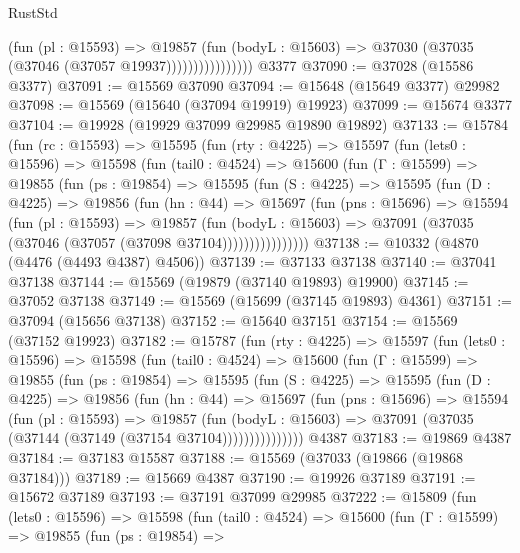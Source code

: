 \begin{lexlean}{RustStd}
\begin{coremodule}
                          (fun (pl : @15593) =>
                          @19857
                            (fun (bodyL : @15603) =>
                            @37030 (@37035 (@37046 (@37057 @19937))))))))))))))))
    @3377
@37090 := @37028 (@15586 @3377)
@37091 := @15569 @37090
@37094 := @15648 (@15649 @3377) @29982
@37098 := @15569 (@15640 (@37094 @19919) @19923)
@37099 := @15674 @3377
@37104 := @19928 (@19929 @37099 @29985 @19890 @19892)
@37133 := @15784
    (fun (rc : @15593) =>
    @15595
      (fun (rty : @4225) =>
      @15597
        (fun (lets0 : @15596) =>
        @15598
          (fun (tail0 : @4524) =>
          @15600
            (fun (Γ : @15599) =>
            @19855
              (fun (ps : @19854) =>
              @15595
                (fun (S : @4225) =>
                @15595
                  (fun (D : @4225) =>
                  @19856
                    (fun (hn : @44) =>
                    @15697
                      (fun (pns : @15696) =>
                      @15594
                        (fun (pl : @15593) =>
                        @19857
                          (fun (bodyL : @15603) =>
                          @37091 (@37035 (@37046 (@37057 (@37098 @37104))))))))))))))))
@37138 := @10332 (@4870 (@4476 (@4493 @4387) @4506))
@37139 := @37133 @37138
@37140 := @37041 @37138
@37144 := @15569 (@19879 (@37140 @19893) @19900)
@37145 := @37052 @37138
@37149 := @15569 (@15699 (@37145 @19893) @4361)
@37151 := @37094 (@15656 @37138)
@37152 := @15640 @37151
@37154 := @15569 (@37152 @19923)
@37182 := @15787
    (fun (rty : @4225) =>
    @15597
      (fun (lets0 : @15596) =>
      @15598
        (fun (tail0 : @4524) =>
        @15600
          (fun (Γ : @15599) =>
          @19855
            (fun (ps : @19854) =>
            @15595
              (fun (S : @4225) =>
              @15595
                (fun (D : @4225) =>
                @19856
                  (fun (hn : @44) =>
                  @15697
                    (fun (pns : @15696) =>
                    @15594
                      (fun (pl : @15593) =>
                      @19857
                        (fun (bodyL : @15603) =>
                        @37091 (@37035 (@37144 (@37149 (@37154 @37104)))))))))))))))
    @4387
@37183 := @19869 @4387
@37184 := @37183 @15587
@37188 := @15569 (@37033 (@19866 (@19868 @37184)))
@37189 := @15669 @4387
@37190 := @19926 @37189
@37191 := @15672 @37189
@37193 := @37191 @37099 @29985
@37222 := @15809
    (fun (lets0 : @15596) =>
    @15598
      (fun (tail0 : @4524) =>
      @15600
        (fun (Γ : @15599) =>
        @19855
          (fun (ps : @19854) =>

\end{coremodule}
\end{lexlean}
